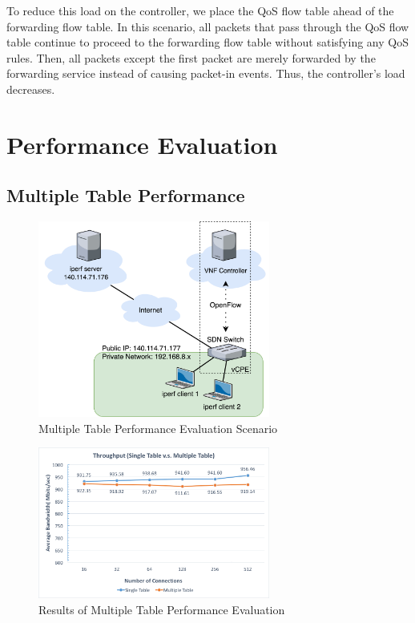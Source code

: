 \documentclass[conference]{IEEEtran}
\begin{document}
To reduce this load on the controller, we place the QoS flow table ahead of the forwarding flow table. In this scenario, all packets that pass through the QoS flow table continue to proceed to the forwarding flow table without satisfying any QoS rules. Then, all packets except the first packet are merely forwarded by the forwarding service instead of causing packet-in events. Thus, the controller’s load decreases.




\section{Performance Evaluation}
\subsection{Multiple Table Performance}

\begin{figure}[!t]
\centering
\includegraphics[width=3in]{./figures/evaluation_nat_scenario}
\caption{Multiple Table Performance Evaluation Scenario}
\label{fig:evaluation_nat_scenario}
\end{figure}

\begin{figure}[!t]
\centering
\includegraphics[width=3in]{./figures/evaluation_nat}
\caption{Results of Multiple Table Performance Evaluation}
\label{fig:evaluation_nat_result}
\end{figure}
\end{document}
